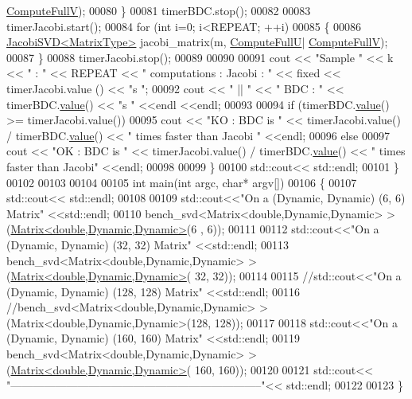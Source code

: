 \begin{DoxyCode}
      \hyperlink{group__enums_ggae3e239fb70022eb8747994cf5d68b4a9a52c6f7e80bbf9a42297c88f700245b51}{ComputeFullV});
00080     \}
00081     timerBDC.stop();
00082     
00083     timerJacobi.start();
00084     \textcolor{keywordflow}{for} (\textcolor{keywordtype}{int} i=0; i<REPEAT; ++i) 
00085     \{
00086       \hyperlink{group___s_v_d___module_class_eigen_1_1_jacobi_s_v_d}{JacobiSVD<MatrixType>} jacobi\_matrix(m, \hyperlink{group__enums_ggae3e239fb70022eb8747994cf5d68b4a9a2b4f91ca5859a4159dbfe8090043817f}{ComputeFullU}|
      \hyperlink{group__enums_ggae3e239fb70022eb8747994cf5d68b4a9a52c6f7e80bbf9a42297c88f700245b51}{ComputeFullV});
00087     \}
00088     timerJacobi.stop();
00089 
00090 
00091     cout << \textcolor{stringliteral}{"Sample "} << k << \textcolor{stringliteral}{" : "} << REPEAT << \textcolor{stringliteral}{" computations :  Jacobi : "} << fixed << timerJacobi.value
      () << \textcolor{stringliteral}{"s "};
00092     cout << \textcolor{stringliteral}{" || "} << \textcolor{stringliteral}{" BDC : "} << timerBDC.\hyperlink{class_eigen_1_1_bench_timer_a26760f963ed8b64c126159bfea57735e}{value}() << \textcolor{stringliteral}{"s "} <<endl <<endl;
00093       
00094     \textcolor{keywordflow}{if} (timerBDC.\hyperlink{class_eigen_1_1_bench_timer_a26760f963ed8b64c126159bfea57735e}{value}() >= timerJacobi.value())  
00095       cout << \textcolor{stringliteral}{"KO : BDC is "} <<  timerJacobi.value() / timerBDC.\hyperlink{class_eigen_1_1_bench_timer_a26760f963ed8b64c126159bfea57735e}{value}() << \textcolor{stringliteral}{"  times faster than Jacobi
      "} <<endl;
00096     \textcolor{keywordflow}{else} 
00097       cout << \textcolor{stringliteral}{"OK : BDC is "} << timerJacobi.value() / timerBDC.\hyperlink{class_eigen_1_1_bench_timer_a26760f963ed8b64c126159bfea57735e}{value}() << \textcolor{stringliteral}{"  times faster than Jacobi"}
        <<endl;
00098       
00099   \}
00100   std::cout<< std::endl;
00101 \}
00102 
00103 
00104 
00105 \textcolor{keywordtype}{int} main(\textcolor{keywordtype}{int} argc, \textcolor{keywordtype}{char}* argv[])
00106 \{
00107   std::cout<< std::endl;
00108 
00109   std::cout<<\textcolor{stringliteral}{"On a (Dynamic, Dynamic) (6, 6) Matrix"} <<std::endl;
00110   bench\_svd<Matrix<double,Dynamic,Dynamic> >(\hyperlink{group___core___module_class_eigen_1_1_matrix}{Matrix<double,Dynamic,Dynamic>}(6
      , 6));
00111   
00112   std::cout<<\textcolor{stringliteral}{"On a (Dynamic, Dynamic) (32, 32) Matrix"} <<std::endl;
00113   bench\_svd<Matrix<double,Dynamic,Dynamic> >(\hyperlink{group___core___module_class_eigen_1_1_matrix}{Matrix<double,Dynamic,Dynamic>}(
      32, 32));
00114 
00115   \textcolor{comment}{//std::cout<<"On a (Dynamic, Dynamic) (128, 128) Matrix" <<std::endl;}
00116   \textcolor{comment}{//bench\_svd<Matrix<double,Dynamic,Dynamic> >(Matrix<double,Dynamic,Dynamic>(128, 128));}
00117 
00118   std::cout<<\textcolor{stringliteral}{"On a (Dynamic, Dynamic) (160, 160) Matrix"} <<std::endl;
00119   bench\_svd<Matrix<double,Dynamic,Dynamic> >(\hyperlink{group___core___module_class_eigen_1_1_matrix}{Matrix<double,Dynamic,Dynamic>}(
      160, 160));
00120   
00121   std::cout<< \textcolor{stringliteral}{"--------------------------------------------------------------------"}<< std::endl;
00122            
00123 \}
\end{DoxyCode}
